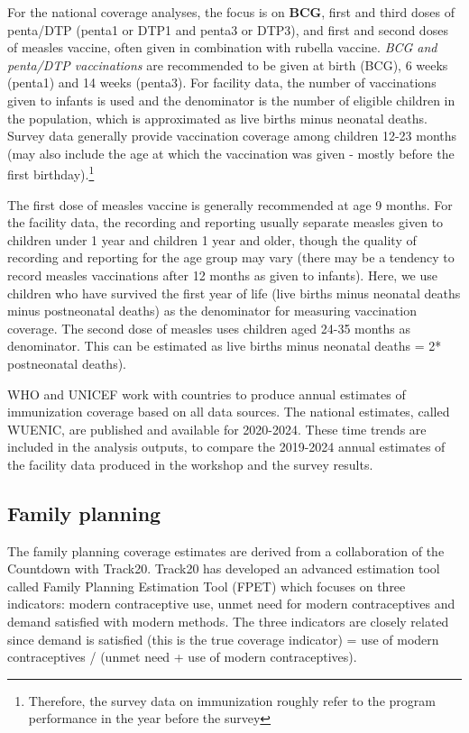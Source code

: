 \documentclass[
  english,
  letterpaper,
  DIV=11,
  numbers=noendperiod]{scrreprt}
\begin{document}
For the national coverage analyses, the focus is on \textbf{BCG}, first
and third doses of penta/DTP (penta1 or DTP1 and penta3 or DTP3), and
first and second doses of measles vaccine, often given in combination
with rubella vaccine. \emph{BCG and penta/DTP vaccinations} are
recommended to be given at birth (BCG), 6 weeks (penta1) and 14 weeks
(penta3). For facility data, the number of vaccinations given to infants
is used and the denominator is the number of eligible children in the
population, which is approximated as live births minus neonatal deaths.
Survey data generally provide vaccination coverage among children 12-23
months (may also include the age at which the vaccination was given -
mostly before the first birthday).\footnote{Therefore, the survey data
  on immunization roughly refer to the program performance in the year
  before the survey}

The first dose of measles vaccine is generally recommended at age 9
months. For the facility data, the recording and reporting usually
separate measles given to children under 1 year and children 1 year and
older, though the quality of recording and reporting for the age group
may vary (there may be a tendency to record measles vaccinations after
12 months as given to infants). Here, we use children who have survived
the first year of life (live births minus neonatal deaths minus
postneonatal deaths) as the denominator for measuring vaccination
coverage. The second dose of measles uses children aged 24-35 months as
denominator. This can be estimated as live births minus neonatal deaths
= 2* postneonatal deaths).

WHO and UNICEF work with countries to produce annual estimates of
immunization coverage based on all data sources. The national estimates,
called WUENIC, are published and available for 2020-2024. These time
trends are included in the analysis outputs, to compare the 2019-2024
annual estimates of the facility data produced in the workshop and the
survey results.

\subsection{Family planning}\label{sec-nat-cov-fp}

The family planning coverage estimates are derived from a collaboration
of the Countdown with Track20. Track20 has developed an advanced
estimation tool called Family Planning Estimation Tool (FPET) which
focuses on three indicators: modern contraceptive use, unmet need for
modern contraceptives and demand satisfied with modern methods. The
three indicators are closely related since demand is satisfied (this is
the true coverage indicator) = use of modern contraceptives / (unmet
need + use of modern contraceptives).
\end{document}
